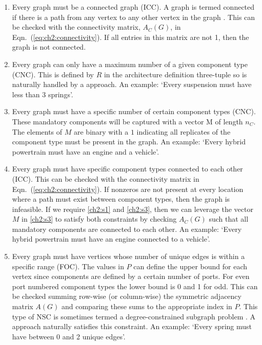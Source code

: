 \begin{enumerate}[label=$S_{\!\arabic*}$]

\item \label{ch2:s1} Every graph must be a connected graph (ICC). A graph is termed connected if there is a path from any vertex to any other vertex in the graph \cite[p.~18]{Diestel2000a}. This can be checked with the connectivity matrix, $A_C(G)$, in Eqn.~(\ref{eq:ch2:connectivity}). If all entries in this matrix are not 1, then the graph is not connected.

\item \label{ch2:s2} Every graph can only have a maximum number of a given component type (CNC). This is defined by $R$ in the architecture definition three-tuple so is naturally handled by a \mypm{} approach. An example: `Every suspension must have less than 3 springs'.

\item \label{ch2:s3} Every graph must have a specific number of certain component types (CNC). These mandatory components will be captured with a vector \gls{M} of length $n_C$. The elements of $M$ are binary with a $1$ indicating all replicates of the component type must be present in the graph. An example: `Every hybrid powertrain must have an engine and a vehicle'.

\item \label{ch2:s4} Every graph must have specific component types connected to each other (ICC). This can be checked with the connectivity matrix in Eqn.~(\ref{eq:ch2:connectivity}). If nonzeros are not present at every location where a path must exist between component types, then the graph is infeasible. If we require \ref{ch2:s1} and \ref{ch2:s3}, then we can leverage the vector $M$ in \ref{ch2:s3} to satisfy both constraints by checking $A_C(G)$ such that all mandatory components are connected to each other. An example: `Every hybrid powertrain must have an engine connected to a vehicle'.

\item \label{ch2:s6} Every graph must have vertices whose number of unique edges is within a specific range (FOC). The values in $P$ can define the upper bound for each vertex since components are defined by a certain number of ports. For even port numbered component types the lower bound is 0 and 1 for odd. This can be checked summing row-wise (or column-wise) the symmetric adjacency matrix $A(G)$ and comparing these sums to the appropriate index in $P$. This type of NSC is sometimes termed a degree-constrained subgraph problem \cite[p.~217]{Lawler1976a}. A \mypm{} approach naturally satisfies this constraint. An example: `Every spring must have between 0 and 2 unique edges'.


\end{enumerate}
